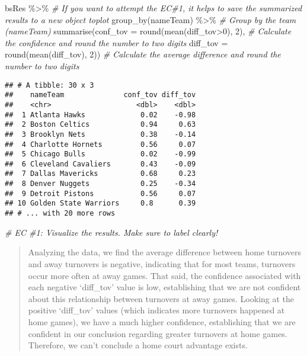 \documentclass[
]{article}
\newenvironment{Shaded}{\begin{snugshade}}{\end{snugshade}}
\newcommand{\AttributeTok}[1]{\textcolor[rgb]{0.77,0.63,0.00}{#1}}
\newcommand{\CommentTok}[1]{\textcolor[rgb]{0.56,0.35,0.01}{\textit{#1}}}
\newcommand{\DecValTok}[1]{\textcolor[rgb]{0.00,0.00,0.81}{#1}}
\newcommand{\FunctionTok}[1]{\textcolor[rgb]{0.00,0.00,0.00}{#1}}
\newcommand{\NormalTok}[1]{#1}
\newcommand{\SpecialCharTok}[1]{\textcolor[rgb]{0.00,0.00,0.00}{#1}}
\begin{document}
\begin{Shaded}
\begin{Highlighting}[]
\NormalTok{bsRes }\SpecialCharTok{\%\textgreater{}\%} \CommentTok{\# If you want to attempt the EC\#1, it helps to save the summarized results to a new object \textquotesingle{}toplot\textquotesingle{}}
  \FunctionTok{group\_by}\NormalTok{(nameTeam) }\SpecialCharTok{\%\textgreater{}\%} \CommentTok{\# Group by the team (nameTeam)}
  \FunctionTok{summarise}\NormalTok{(}\AttributeTok{conf\_tov =} \FunctionTok{round}\NormalTok{(}\FunctionTok{mean}\NormalTok{(diff\_tov}\SpecialCharTok{\textgreater{}}\DecValTok{0}\NormalTok{), }\DecValTok{2}\NormalTok{), }\CommentTok{\# Calculate the confidence and round the number to two digits}
            \AttributeTok{diff\_tov =} \FunctionTok{round}\NormalTok{(}\FunctionTok{mean}\NormalTok{(diff\_tov), }\DecValTok{2}\NormalTok{)) }\CommentTok{\# Calculate the average difference and round the number to two digits}
\end{Highlighting}
\end{Shaded}

\begin{verbatim}
## # A tibble: 30 x 3
##    nameTeam              conf_tov diff_tov
##    <chr>                    <dbl>    <dbl>
##  1 Atlanta Hawks             0.02    -0.98
##  2 Boston Celtics            0.94     0.63
##  3 Brooklyn Nets             0.38    -0.14
##  4 Charlotte Hornets         0.56     0.07
##  5 Chicago Bulls             0.02    -0.99
##  6 Cleveland Cavaliers       0.43    -0.09
##  7 Dallas Mavericks          0.68     0.23
##  8 Denver Nuggets            0.25    -0.34
##  9 Detroit Pistons           0.56     0.07
## 10 Golden State Warriors     0.8      0.39
## # ... with 20 more rows
\end{verbatim}

\begin{Shaded}
\begin{Highlighting}[]
\CommentTok{\# EC \#1: Visualize the results. Make sure to label clearly!}
\end{Highlighting}
\end{Shaded}

\begin{quote}
Analyzing the data, we find the average difference between home
turnovers and away turnovers is negative, indicating that for most
teams, turnovers occur more often at away games. That said, the
confidence associated with each negative `diff\_tov' value is low,
establishing that we are not confident about this relationship between
turnovers at away games. Looking at the positive `diff\_tov' values
(which indicates more turnovers happened at home games), we have a much
higher confidence, establishing that we are confident in our conclusion
regarding greater turnovers at home games. Therefore, we can't conclude
a home court advantage exists.
\end{quote}
\end{document}
